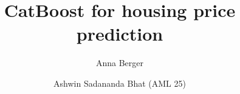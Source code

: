\documentclass[format=acmsmall, review=false, screen=true]{acmart}
\begin{document}
\title{CatBoost for housing price prediction}

\author{Anna Berger}

\author{Ashwin Sadananda Bhat (AML 25)}






\maketitle
\thispagestyle{plain}











 


\end{document}
